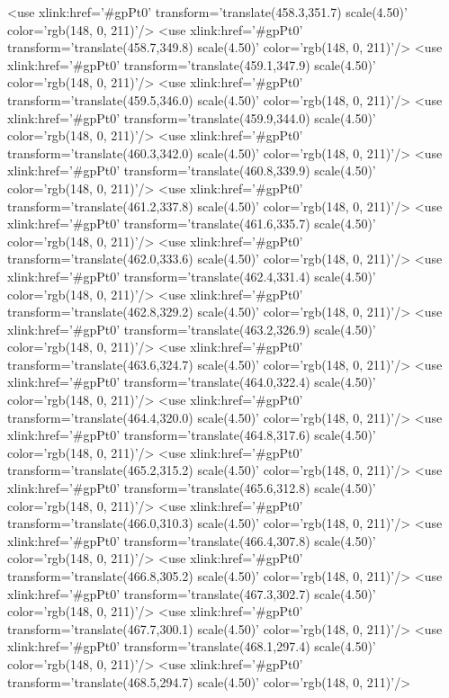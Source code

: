 	<use xlink:href='#gpPt0' transform='translate(458.3,351.7) scale(4.50)' color='rgb(148,   0, 211)'/>
	<use xlink:href='#gpPt0' transform='translate(458.7,349.8) scale(4.50)' color='rgb(148,   0, 211)'/>
	<use xlink:href='#gpPt0' transform='translate(459.1,347.9) scale(4.50)' color='rgb(148,   0, 211)'/>
	<use xlink:href='#gpPt0' transform='translate(459.5,346.0) scale(4.50)' color='rgb(148,   0, 211)'/>
	<use xlink:href='#gpPt0' transform='translate(459.9,344.0) scale(4.50)' color='rgb(148,   0, 211)'/>
	<use xlink:href='#gpPt0' transform='translate(460.3,342.0) scale(4.50)' color='rgb(148,   0, 211)'/>
	<use xlink:href='#gpPt0' transform='translate(460.8,339.9) scale(4.50)' color='rgb(148,   0, 211)'/>
	<use xlink:href='#gpPt0' transform='translate(461.2,337.8) scale(4.50)' color='rgb(148,   0, 211)'/>
	<use xlink:href='#gpPt0' transform='translate(461.6,335.7) scale(4.50)' color='rgb(148,   0, 211)'/>
	<use xlink:href='#gpPt0' transform='translate(462.0,333.6) scale(4.50)' color='rgb(148,   0, 211)'/>
	<use xlink:href='#gpPt0' transform='translate(462.4,331.4) scale(4.50)' color='rgb(148,   0, 211)'/>
	<use xlink:href='#gpPt0' transform='translate(462.8,329.2) scale(4.50)' color='rgb(148,   0, 211)'/>
	<use xlink:href='#gpPt0' transform='translate(463.2,326.9) scale(4.50)' color='rgb(148,   0, 211)'/>
	<use xlink:href='#gpPt0' transform='translate(463.6,324.7) scale(4.50)' color='rgb(148,   0, 211)'/>
	<use xlink:href='#gpPt0' transform='translate(464.0,322.4) scale(4.50)' color='rgb(148,   0, 211)'/>
	<use xlink:href='#gpPt0' transform='translate(464.4,320.0) scale(4.50)' color='rgb(148,   0, 211)'/>
	<use xlink:href='#gpPt0' transform='translate(464.8,317.6) scale(4.50)' color='rgb(148,   0, 211)'/>
	<use xlink:href='#gpPt0' transform='translate(465.2,315.2) scale(4.50)' color='rgb(148,   0, 211)'/>
	<use xlink:href='#gpPt0' transform='translate(465.6,312.8) scale(4.50)' color='rgb(148,   0, 211)'/>
	<use xlink:href='#gpPt0' transform='translate(466.0,310.3) scale(4.50)' color='rgb(148,   0, 211)'/>
	<use xlink:href='#gpPt0' transform='translate(466.4,307.8) scale(4.50)' color='rgb(148,   0, 211)'/>
	<use xlink:href='#gpPt0' transform='translate(466.8,305.2) scale(4.50)' color='rgb(148,   0, 211)'/>
	<use xlink:href='#gpPt0' transform='translate(467.3,302.7) scale(4.50)' color='rgb(148,   0, 211)'/>
	<use xlink:href='#gpPt0' transform='translate(467.7,300.1) scale(4.50)' color='rgb(148,   0, 211)'/>
	<use xlink:href='#gpPt0' transform='translate(468.1,297.4) scale(4.50)' color='rgb(148,   0, 211)'/>
	<use xlink:href='#gpPt0' transform='translate(468.5,294.7) scale(4.50)' color='rgb(148,   0, 211)'/>
